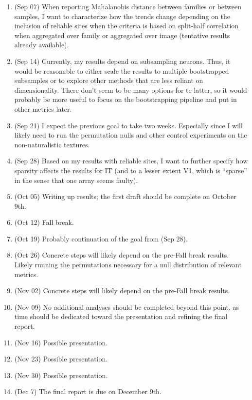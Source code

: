 \documentclass[
  11pt,
  letterpaper,
  DIV=11,
  numbers=noendperiod]{scrartcl}
\providecommand{\tightlist}{%
  \setlength{\itemsep}{0pt}\setlength{\parskip}{0pt}}
\begin{document}
\begin{enumerate}
\def\labelenumi{\arabic{enumi}.}
\tightlist
\item
  (Sep 07) When reporting Mahalanobis distance between families or
  between samples, I want to characterize how the trends change
  depending on the inclusion of reliable sites when the criteria is
  based on split-half correlation when aggregated over family or
  aggregated over image (tentative results already available).
\item
  (Sep 14) Currently, my results depend on subsampling neurons. Thus, it
  would be reasonable to either scale the results to multiple
  bootstrapped subsamples or to explore other methods that are less
  reliant on dimensionality. There don't seem to be many options for te
  latter, so it would probably be more useful to focus on the
  bootstrapping pipeline and put in other metrics later.
\item
  (Sep 21) I expect the previous goal to take two weeks. Especially
  since I will likely need to run the permutation nulls and other
  control experiments on the non-naturalistic textures.
\item
  (Sep 28) Based on my results with reliable sites, I want to further
  specify how sparsity affects the results for IT (and to a lesser
  extent V1, which is ``sparse'' in the sense that one array seems
  faulty).
\item
  (Oct 05) Writing up results; the first draft should be complete on
  October 9th.
\item
  (Oct 12) Fall break.
\item
  (Oct 19) Probably continuation of the goal from (Sep 28).
\item
  (Oct 26) Concrete steps will likely depend on the pre-Fall break
  results. Likely running the permutations necessary for a null
  distribution of relevant metrics.
\item
  (Nov 02) Concrete steps will likely depend on the pre-Fall break
  results.
\item
  (Nov 09) No additional analyses should be completed beyond this point,
  as time should be dedicated toward the presentation and refining the
  final report.
\item
  (Nov 16) Possible presentation.
\item
  (Nov 23) Possible presentation.
\item
  (Nov 30) Possible presentation.
\item
  (Dec 7) The final report is due on December 9th.
\end{enumerate}
\end{document}
